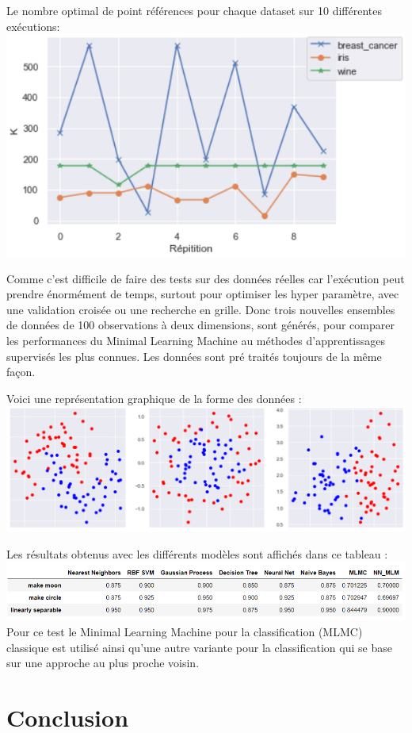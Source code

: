 \documentclass[12pt,a4paper]{report}
\begin{document}
\par Le nombre optimal de point références pour chaque dataset sur 10 différentes exécutions: \\
\includegraphics[scale=0.99]{classif3.png}
 
\par Comme c'est difficile de faire des tests sur des données réelles car l'exécution peut prendre énormément de temps, surtout pour optimiser les hyper paramètre, avec une validation croisée ou une recherche en grille. Donc trois nouvelles ensembles de données de 100 observations à deux dimensions, sont générés, pour comparer les performances du Minimal Learning Machine au méthodes d'apprentissages supervisés les plus connues. Les données sont pré traités toujours de la même façon.
\par Voici une représentation graphique de la forme des données :\\
\includegraphics[scale=0.6]{classif5.png}

\par Les résultats obtenus avec les différents modèles sont affichés dans ce tableau :\\
\includegraphics[scale=0.8]{classif4.png}\\
Pour ce test le Minimal Learning Machine pour la classification (MLMC) classique est utilisé ainsi qu'une autre variante pour la classification qui se base sur une approche au plus proche voisin.
{\color{MidnightBlue}\chapter{Conclusion}}
\end{document}

